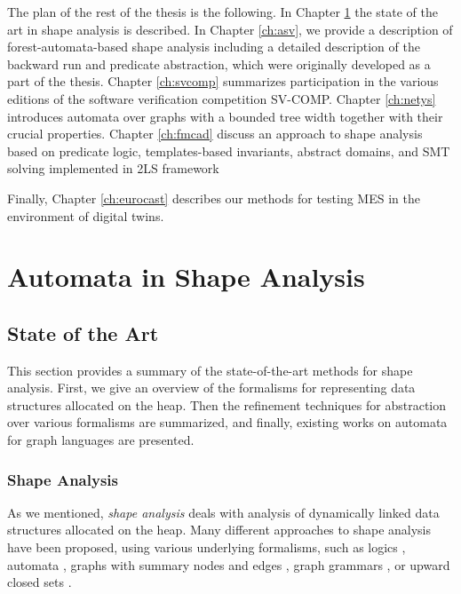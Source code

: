 The plan of the rest of the thesis is the following.
In Chapter \ref{ch:state-of-the-art} the state of the art in shape analysis is described.
In Chapter \ref{ch:asv}, we provide a description of forest-automata-based
shape analysis including a detailed description of the backward run and predicate abstraction,
which were originally developed as a part of the thesis.
Chapter \ref{ch:svcomp} summarizes \forester participation in the various editions
of the software verification competition SV-COMP.
Chapter \ref{ch:netys} introduces automata over graphs with a bounded tree width together
with their crucial properties.
Chapter \ref{ch:fmcad} discuss an approach to shape analysis based on predicate logic, templates-based invariants, abstract domains, and SMT solving
implemented in 2LS framework \cite{2ls:tacas}

Finally, Chapter \ref{ch:eurocast} describes our methods for testing MES in the environment
of digital twins.

\part{Automata in Shape Analysis}

\chapter{State of the Art}
\label{ch:state-of-the-art}
This section provides a summary of the state-of-the-art methods for shape analysis.
First, we give an overview of the formalisms for representing data structures allocated on the heap.
Then the refinement techniques for abstraction over various formalisms are summarized, and
finally, existing works on automata for graph languages are presented.

\section{Shape Analysis}
As we mentioned, \emph{shape analysis} deals with analysis of dynamically linked data structures
allocated on the heap.
Many different approaches to shape analysis have been proposed, using various
underlying formalisms, such as logics
\cite{jensen,pale01,pale,Reynolds:SepLogic:02,InvaderCAV07,indPrSynt07,ndqc07,Zee:pldi08,InvaderCAV08,abduction11,mpq11,slayer11,predator11,overlaid11,indPrSynt07,thor10,sas07:chang_rival_necula,dragoi:atva12,sleek13},
automata \cite{bhrv06b,deg06,forester12,boxes13,lists-counters},
graphs with summary nodes and edges \cite{sas07:chang_rival_necula,dudka13sas},
graph grammars \cite{juggrnaut10,juggrnaut-learning12}, or upward closed sets \cite{paroshBackward}.

